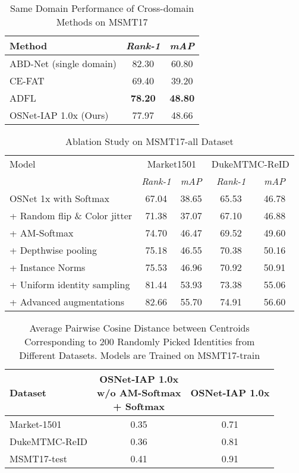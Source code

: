 \documentclass[a4paper,conference]{IEEEtran}
\begin{document}
\begin{table}
\caption{Same Domain Performance of Cross-domain Methods on MSMT17}
\label{tab:same}
  \centering
  \begin{tabular}{l|cc}
    \hline
    Method & \textit{Rank-1} & \textit{mAP} \\
    \hline
    ABD-Net \cite{abd} (single domain) & 82.30 & 60.80 \\
    \hline
    CE-FAT \cite{inDefenceTriplet2} & 69.40 & 39.20 \\
    ADFL \cite{Liu2019AttentionAB} & \textbf{78.20} & \textbf{48.80} \\
    \hline
    OSNet-IAP 1.0x (Ours) & 77.97 & 48.66 \\
    \hline
  \end{tabular}
\end{table}

\begin{table*}
  \centering
  \caption{Ablation Study on MSMT17-all Dataset}
  \label{tab:ablation_ms}
  \begin{tabular}{l|cc|cc}
    \hline
    Model & \multicolumn{2}{c}{Market1501} & \multicolumn{2}{|c}{DukeMTMC-ReID}   \\
     & \textit{Rank-1} & \textit{mAP}  & \textit{Rank-1} & \textit{mAP}  \\
    \hline
    OSNet 1x with Softmax & 67.04 & 38.65 & 65.53 & 46.78 \\
    + Random flip \& Color jitter & 71.38 & 37.07 & 67.10 & 46.88 \\
    + AM-Softmax & 74.70 & 46.47 & 69.52 & 49.60 \\
    + Depthwise pooling & 75.18 & 46.55 & 70.38 & 50.16 \\
    + Instance Norms & 75.53 & 46.96 & 70.92 & 50.91 \\
    + Uniform identity sampling & 81.44 & 53.93 & 73.38 & 55.06 \\
    + Advanced augmentations & 82.66 & 55.70 & 74.91 & 56.60 \\
    \hline
  \end{tabular}
\end{table*}

\begin{table}
  \centering
  \caption{Average Pairwise Cosine Distance between Centroids Corresponding to 200 Randomly
           Picked Identities from Different Datasets. Models are Trained on MSMT17-train}
  \label{tab:cosine}
  \begin{tabular}{l|cc}
    \hline
    Dataset & \makecell{OSNet-IAP 1.0x \\ w/o AM-Softmax \\ + Softmax} & OSNet-IAP 1.0x  \\
    \hline
    Market-1501   & 0.35 & 0.71 \\
    DukeMTMC-ReID & 0.36  & 0.81  \\
    \hline
    MSMT17-test   & 0.41 & 0.91   \\
    \hline
  \end{tabular}
\end{table}
\end{document}
